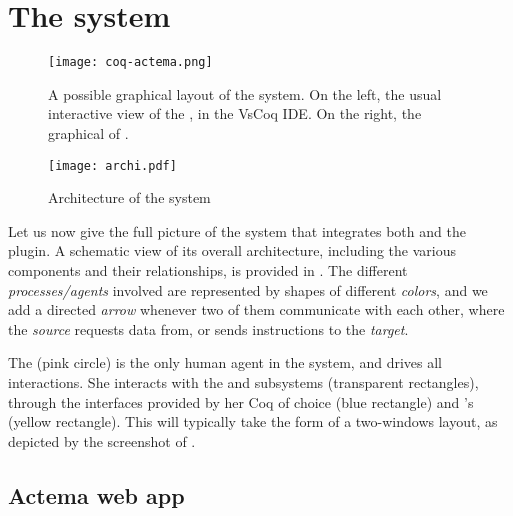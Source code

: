 \section{The  system}
\begin{figure*}
  \texttt{[image: coq-actema.png]}
  \caption{ A possible graphical layout of the  system. On
    the left, the usual interactive view of the , in the VsCoq IDE.
    On the right, the graphical  of .}
\end{figure*}

\begin{figure*}
  \texttt{[image: archi.pdf]}
  \caption{Architecture of the  system}
\end{figure*}


Let us now give the full picture of the  system that
integrates both  and the  plugin. A schematic view of its overall
architecture, including the various components and their relationships, is
provided in . The different \emph{processes/agents} involved are
represented by shapes of different \emph{colors}, and we add a directed
\emph{arrow} whenever two of them communicate with each other, where the
\emph{source} requests data from, or sends instructions to the \emph{target}.

The  (pink circle) is the only human agent in the system, and
drives all interactions. She interacts with the  and  subsystems
(transparent rectangles), through the interfaces provided by her Coq
 of choice (blue rectangle) and 's  (yellow
rectangle). This will typically take the form of a two-windows layout, as
depicted by the screenshot of .

\subsection{Actema web app}


